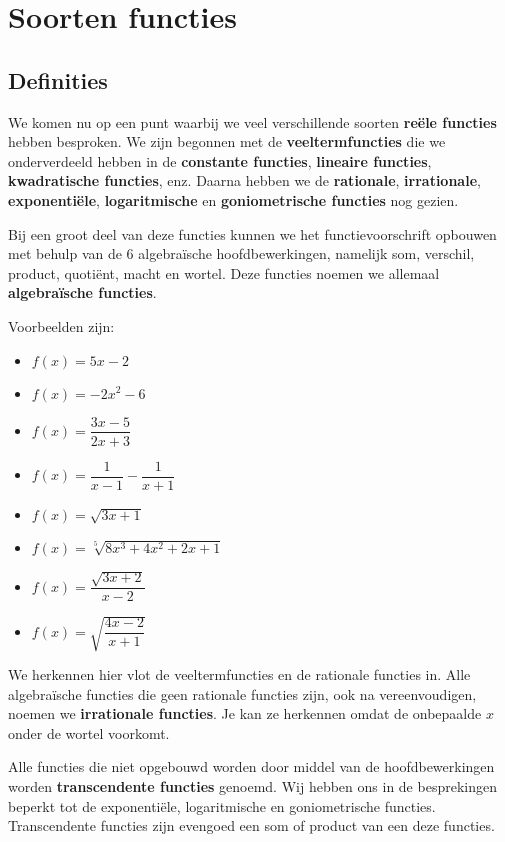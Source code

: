 \documentclass[12pt]{article}
\begin{document}
\section{Soorten functies}

\begin{theorie}

\subsection{Definities}
We komen nu op een punt waarbij we veel verschillende soorten {\bf reële functies} hebben besproken. We zijn begonnen met de {\bf veeltermfuncties} die we onderverdeeld hebben in de {\bf constante functies}, {\bf lineaire functies}, {\bf kwadratische functies}, enz. Daarna hebben we de {\bf rationale}, {\bf irrationale}, {\bf exponentiële}, {\bf logaritmische} en {\bf goniometrische functies} nog gezien.

Bij een groot deel van deze functies kunnen we het functievoorschrift opbouwen met behulp van de 6 algebraïsche hoofdbewerkingen, namelijk som, verschil, product, quotiënt, macht en wortel. Deze functies noemen we allemaal {\bf algebraïsche functies}.

Voorbeelden zijn:
\begin{multicols}{2}
  \begin{itemize}
    \item $\displaystyle f(x)=5x-2$
    \item $\displaystyle f(x)=-2x^2-6$
    \item $\displaystyle f(x)=\dfrac{3x-5}{2x+3}$
    \item $\displaystyle f(x)=\dfrac{1}{x-1}-\dfrac{1}{x+1}$
    \item $\displaystyle f(x)=\sqrt{3x+1}$
    \item $\displaystyle f(x)=\sqrt[5]{8x^3+4x^2+2x+1}$
    \item $\displaystyle f(x)=\dfrac{\sqrt{3x+2}}{x-2}$
    \item $\displaystyle f(x)=\sqrt{\dfrac{4x-2}{x+1}}$
  \end{itemize}
\end{multicols}

We herkennen hier vlot de veeltermfuncties en de rationale functies in. Alle algebraïsche functies die geen rationale functies zijn, ook na vereenvoudigen, noemen we {\bf irrationale functies}. Je kan ze herkennen omdat de onbepaalde $x$ onder de wortel voorkomt.

Alle functies die niet opgebouwd worden door middel van de hoofdbewerkingen worden {\bf transcendente functies} genoemd. Wij hebben ons in de besprekingen beperkt tot de exponentiële, logaritmische en goniometrische functies. Transcendente functies zijn evengoed een som of product van een deze functies.


\end{theorie}
\end{document}
